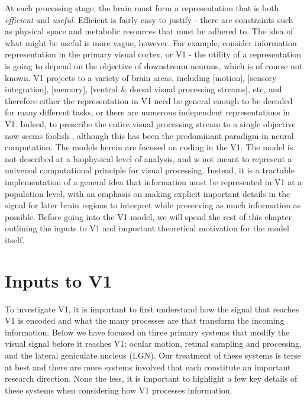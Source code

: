 At each processing stage, the brain must form a representation that is both \textit{efficient} and \textit{useful}. Efficient is fairly easy to justify - there are constraints such as physical space and metabolic resources that must be adhered to. The idea of what might be useful is more vague, however. For example, consider information representation in the primary visual cortex, or V1 - the utility of a representation is going to depend on the objective of downstream neurons, which is of course not known. V1 projects to a variety of brain areas, including [motion], [sensory integration], [memory], [ventral \& dorsal visual processing streams], etc, and therefore either the representation in V1 need be general enough to be decoded for many different tasks, or there are numerous independent representations in V1. Indeed, to prescribe the entire visual processing stream to a single objective now seems foolish \cite{barlow2001redundancy}, although this has been the predominant paradigm in neural computation. The models herein are focused on coding in the V1. The model is not described at a biophysical level of analysis, and is not meant to represent a universal computational principle for visual processing. Instead, it is a tractable implementation of a general idea that information must be represented in V1 at a population level, with an emphasis on making explicit important details in the signal for later brain regions to interpret while preserving as much information as possible. Before going into the V1 model, we will spend the rest of this chapter outlining the inputs to V1 and important theoretical motivation for the model itself.


\section{Inputs to V1}
To investigate V1, it is important to first understand how the signal that reaches V1 is encoded and what the many processes are that transform the incoming information. Below we have focused on three primary systems that modify the visual signal before it reaches V1: ocular motion, retinal sampling and processing, and the lateral geniculate nucleus (LGN). Our treatment of these systems is terse at best and there are more systems involved that each constitute an important research direction. None the less, it is important to highlight a few key details of these systems when considering how V1 processes information.


